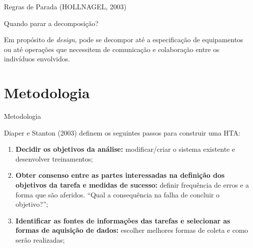 \documentclass[xcolor=dvipsnames]{beamer}
\let\olditem=\item%
\renewcommand{\item}{\olditem \justifying}%
\begin{document}
\begin{frame}{Regras de Parada (HOLLNAGEL, 2003)}

	\begin{block}{Quando parar a decomposição?}
    
		Em propósito de \textit{design}, pode se decompor até a especificação de equipamentos ou até operações que necessitem de comunicação e colaboração entre os indivíduos envolvidos.

	\end{block}

\end{frame}



\section{Metodologia}


\begin{frame}{Metodologia}
    
        
	Diaper e Stanton (2003) definem os seguintes passos para construir uma HTA:
    
    \bigskip
        
    \begin{enumerate}

		\item \textbf{Decidir os objetivos da análise:} modificar/criar o sistema existente e desenvolver treinamentos;

		\bigskip            

		\item \textbf{Obter consenso entre as partes interessadas na definição dos objetivos da tarefa e medidas de sucesso:} definir frequência de erros e a forma que são aferidos. ``Qual a consequência na falha de concluir o objetivo?'';

		\bigskip            

		\item \textbf{Identificar as fontes de informações das tarefas e selecionar as formas de aquisição de dados:} escolher melhores formas de coleta e como serão realizadas;

	\end{enumerate}
        
\end{frame}
\end{document}

